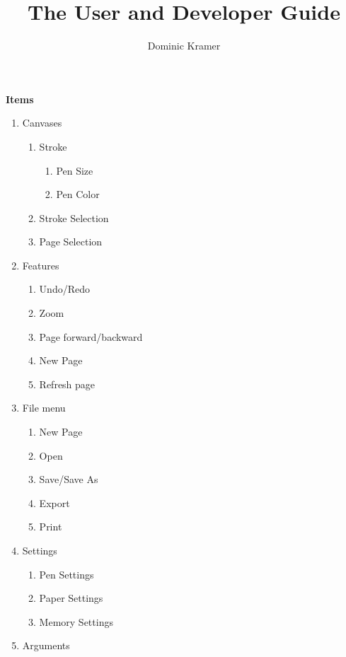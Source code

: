 \documentclass[letterpaper,11pt]{article}
\title{The \notelab User and Developer Guide}
\author{Dominic Kramer}
\begin{document}
  
  \maketitle
  
  \textbf{Items}
  \begin{enumerate}
    \item Canvases
          \begin{enumerate}
            \item Stroke
                  \begin{enumerate}
                    \item Pen Size
                    \item Pen Color
                  \end{enumerate}
            \item Stroke Selection
            \item Page Selection
          \end{enumerate}
    \item Features
          \begin{enumerate}
            \item Undo/Redo
            \item Zoom
            \item Page forward/backward
            \item New Page
            \item Refresh page
          \end{enumerate}
    \item File menu
          \begin{enumerate}
            \item New Page
            \item Open
            \item Save/Save As
            \item Export
            \item Print
          \end{enumerate}
    \item Settings
          \begin{enumerate}
            \item Pen Settings
            \item Paper Settings
            \item Memory Settings
          \end{enumerate}
    \item Arguments
          \begin{enumerate}

\end{enumerate}
\end{enumerate}
\end{document}
